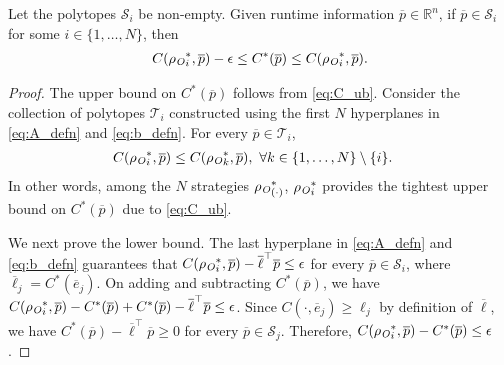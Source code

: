\begin{thm}\label{thm:bounds}
    Let the polytopes $\mathcal{S}_i$ be non-empty. Given runtime information $ \overline{p} \in \mathbb{R}^n$,
    if $ \overline{p}\in \mathcal{S}_i$ for some
    $i\in\{1,\ldots, N\}$, then
    \begin{align}
        C({\rho_{\textit{O}}}_i^\ast,
    \overline{p}) - \epsilon \leq
        C^\ast(\overline{p}) \leq
        C({\rho_{\textit{O}}}_i^\ast,
    \overline{p}). \nonumber
    \end{align}
\end{thm}
\begin{proof}
   The upper bound on $C^\ast( \overline{p})$ follows from
   \eqref{eq:C_ub}. Consider the collection of polytopes $
    \mathcal{T}_i$ constructed using the first $N$
    hyperplanes in \eqref{eq:A_defn} and \eqref{eq:b_defn}.
    For every $ \overline{p}\in \mathcal{T}_i$,
    \begin{align}
        C({\rho_{\textit{O}}}_i^\ast, \overline{p})&\leq
        C({\rho_{\textit{O}}}_k^\ast, \overline{p}),\ \forall
        k\in\{1,\ldots,N\}\setminus\{i\}\label{eq:dom}.
    \end{align}
    In other words, among the $N$  strategies
    ${\rho_{\textit{O}}}_{(\cdot)}^\ast$,
    ${\rho_{\textit{O}}}_{i}^\ast$ provides the tightest upper
    bound on $C^\ast( \overline{p})$ due to \eqref{eq:C_ub}. 
    
   
   We next prove the lower bound. The last
   hyperplane in \eqref{eq:A_defn} and \eqref{eq:b_defn}
   guarantees that $ C(
   {\rho_{\textit{O}}}_i^\ast, \overline{p}) -  \overline{\ell}^\top \overline{p} \leq \epsilon$ for
   every $ \overline{p}\in \mathcal{S}_i$, where $\overline{\ell}_j = C^\ast( \overline{e}_j)$. On adding and
   subtracting $C^\ast( \overline{p})$, we have
   $C({\rho_{\textit{O}}}_i^\ast, \overline{p}) - C^\ast(
   \overline{p}) + C^\ast(\overline{p}) -
   \overline{\ell}^\top \overline{p} \leq \epsilon$. Since
   $C( \cdot, \overline{e}_j)\geq \ell_j$ by definition of $
   \overline{\ell}$, we have $C^\ast(\overline{p}) -
   \overline{\ell}^\top \overline{p} \geq 0$ for every $
   \overline{p}\in \mathcal{S}_j$. Therefore, $C({\rho_{\textit{O}}}_i^\ast, \overline{p}) - C^\ast(
   \overline{p}) \leq \epsilon$.
\end{proof}
